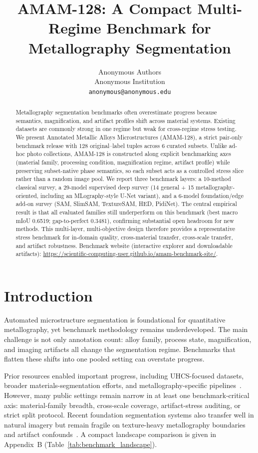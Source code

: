 \documentclass{article}
\title{AMAM-128: A Compact Multi-Regime Benchmark for Metallography Segmentation}
\author{%
  Anonymous Authors\\
  Anonymous Institution\\
  \texttt{anonymous@anonymous.edu}
}
\newcommand{\datasetname}{AMAM-128}
\newcommand{\datasetfull}{Annotated Metallic Alloys Microstructures}
\newcommand{\paircount}{128}
\newcommand{\subsetcount}{6}
\begin{document}
\maketitle

\begin{abstract}
Metallography segmentation benchmarks often overestimate progress because semantics, magnification, and artifact profiles shift across material systems. Existing datasets are commonly strong in one regime but weak for cross-regime stress testing. We present \datasetfull{} (\datasetname{}), a strict pair-only benchmark release with \paircount{} original--label tuples across \subsetcount{} curated subsets. Unlike ad-hoc photo collections, \datasetname{} is constructed along explicit benchmarking axes (material family, processing condition, magnification regime, artifact profile) while preserving subset-native phase semantics, so each subset acts as a controlled stress slice rather than a random image pool. We report three benchmark layers: a 10-method classical survey, a 29-model supervised deep survey (14 general + 15 metallography-oriented, including an MLography-style U-Net variant), and a 6-model foundation/edge add-on survey (SAM, SlimSAM, TextureSAM, HED, PidiNet). The central empirical result is that all evaluated families still underperform on this benchmark (best macro mIoU 0.6519; gap-to-perfect 0.3481), confirming substantial open headroom for new methods. This multi-layer, multi-objective design therefore provides a representative stress benchmark for in-domain quality, cross-material transfer, cross-scale transfer, and artifact robustness. Benchmark website (interactive explorer and downloadable artifacts): \url{https://scientific-computing-user.github.io/amam-benchmark-site/}.
\end{abstract}

\section{Introduction}
Automated microstructure segmentation is foundational for quantitative metallography, yet benchmark methodology remains underdeveloped. The main challenge is not only annotation count: alloy family, process state, magnification, and imaging artifacts all change the segmentation regime. Benchmarks that flatten these shifts into one pooled setting can overstate progress.

Prior resources enabled important progress, including UHCS-focused datasets, broader materials-segmentation efforts, and metallography-specific pipelines~\citep{decost2017uhcsdb,decost2019high,decost2020scientific,luengo2022tutorial,rusanovsky2020mlography,rusanovsky2022end}. However, many public settings remain narrow in at least one benchmark-critical axis: material-family breadth, cross-scale coverage, artifact-stress auditing, or strict split protocol. Recent foundation segmentation systems also transfer well in natural imagery but remain fragile on texture-heavy metallography boundaries and artifact confounds~\citep{kirillov2023segment,ji2023segment,ma2024segment,rusanovsky2023universal,rusanovsky2025texturesam}. A compact landscape comparison is given in Appendix~B (Table~\ref{tab:benchmark_landscape}).
\end{document}
